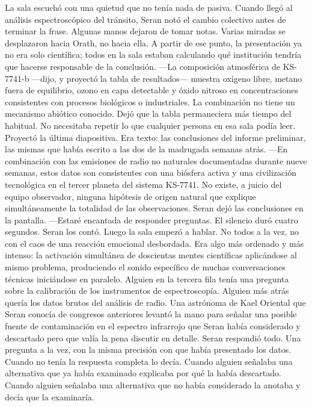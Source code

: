 \documentclass[11pt,a5paper,twoside]{book}
\begin{document}
La sala escuchó con una quietud que no tenía nada de pasiva.
Cuando llegó al análisis espectroscópico del tránsito, Seran notó el cambio colectivo antes de terminar la frase. Algunas manos dejaron de tomar notas. Varias miradas se desplazaron hacia Orath, no hacia ella. A partir de ese punto, la presentación ya no era solo científica; todos en la sala estaban calculando qué institución tendría que hacerse responsable de la conclusión.
—La composición atmosférica de KS-7741-b —dijo, y proyectó la tabla de resultados— muestra oxígeno libre, metano fuera de equilibrio, ozono en capa detectable y óxido nitroso en concentraciones consistentes con procesos biológicos o industriales. La combinación no tiene un mecanismo abiótico conocido.
Dejó que la tabla permaneciera más tiempo del habitual. No necesitaba repetir lo que cualquier persona en esa sala podía leer.
Proyectó la última diapositiva. Era texto: las conclusiones del informe preliminar, las mismas que había escrito a las dos de la madrugada semanas atrás.
—En combinación con las emisiones de radio no naturales documentadas durante nueve semanas, estos datos son consistentes con una biósfera activa y una civilización tecnológica en el tercer planeta del sistema KS-7741. No existe, a juicio del equipo observador, ninguna hipótesis de origen natural que explique simultáneamente la totalidad de las observaciones.
Seran dejó las conclusiones en la pantalla.
—Estaré encantada de responder preguntas.
El silencio duró cuatro segundos. Seran los contó.
Luego la sala empezó a hablar.
No todos a la vez, no con el caos de una reacción emocional desbordada. Era algo más ordenado y más intenso: la activación simultánea de doscientas mentes científicas aplicándose al mismo problema, produciendo el sonido específico de muchas conversaciones técnicas iniciándose en paralelo. Alguien en la tercera fila tenía una pregunta sobre la calibración de los instrumentos de espectroscopía. Alguien más atrás quería los datos brutos del análisis de radio. Una astrónoma de Kael Oriental que Seran conocía de congresos anteriores levantó la mano para señalar una posible fuente de contaminación en el espectro infrarrojo que Seran había considerado y descartado pero que valía la pena discutir en detalle.
Seran respondió todo. Una pregunta a la vez, con la misma precisión con que había presentado los datos. Cuando no tenía la respuesta completa lo decía. Cuando alguien señalaba una alternativa que ya había examinado explicaba por qué la había descartado. Cuando alguien señalaba una alternativa que no había considerado la anotaba y decía que la examinaría.
\end{document}
